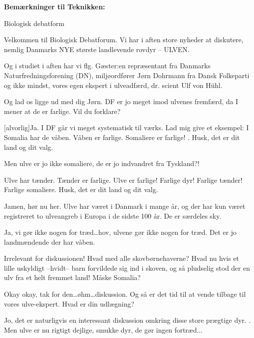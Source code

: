 \documentclass[a4paper,12pt]{article}
\begin{document}
\begin{sketch}


\textbf{Bemærkninger til Teknikken:}

 Biologisk debatform

Velkommen til Biologisk Debatforum. Vi har i aften store nyheder at diskutere, nemlig Danmarks NYE største landlevende rovdyr -- ULVEN.

Og i studiet i aften har vi flg. Gæster:en repræsentant fra Danmarks Naturfredningsforening (DN), miljøordfører Jørn Dohrmann fra Dansk Folkeparti og ikke mindst, vores egen ekspert i ulveadfærd, dr. scient Ulf von Hühl.

Og lad os ligge ud med dig Jørn. DF er jo meget imod ulvenes fremfærd, da I mener at de er farlige. Vil du forklare?

[alvorlig]Ja. I DF går vi meget systematisk til værks. Lad mig give et eksempel: I Somalia har de våben. Våben er farlige. Somaliere er farlige! . Husk, det er dit land og dit valg.

Men ulve er jo ikke somaliere, de er jo indvandret fra Tyskland?!

Ulve har tænder. Tænder er farlige. Ulve er farlige! Farlige dyr! Farlige tænder! Farlige somaliere. Husk, det er dit land og dit valg.


Jamen, hør nu her. Ulve har været i Danmark i mange år, og der har kun været registreret to ulveangreb i Europa i de sidste 100 år. De er særdeles sky.

Ja, vi gør ikke nogen for træd\ldots hov, ulvene gør ikke nogen for træd. Det er jo landmændende der har våben. 

Irrelevant for diskussionen! Hvad med alle skovbørnehaverne? Hvad nu hvis et lille uskyldigt --hvidt-- barn forvildede sig ind i skoven, og så pludselig stod der en ulv fra et helt fremmet land! Måske Somalia?


Okay okay, tak for den\ldots øhm\ldots diskussion. Og så er det tid til at vende tilbage til vores ulve-ekspert. Hvad er din udlægning?

Jo, det er naturligvis en interessant diskussion omkring disse store prægtige dyr. . Men ulve er nu rigtigt dejlige, smukke dyr, de gør ingen fortræd...


\end{sketch}
\end{document}
